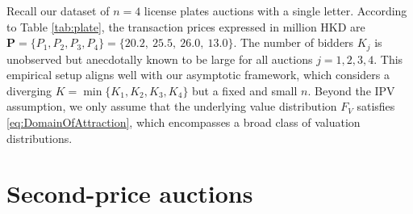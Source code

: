 \begin{runningexamplecont}
Recall our dataset of $n=4$ license plates auctions with a single letter. According to Table \ref{tab:plate}, the transaction prices expressed in million HKD are $\mathbf{P} = \{P_1,P_2,P_3,P_4\} = \{20.2,~ 25.5,~ 26.0,~ 13.0\}$. The number of bidders $K_j$ is unobserved but anecdotally known to be large for all auctions $j=1,2,3,4$. This empirical setup aligns well with our asymptotic framework, which considers a diverging $K = \min\{K_1,K_2,K_3,K_4\}$ but a fixed and small $n$. Beyond the IPV assumption, we only assume that the underlying value distribution $F_V$ satisfies \eqref{eq:DomainOfAttraction}, which encompasses a broad class of valuation distributions.
\end{runningexamplecont}

\section{Second-price auctions}\label{sec:sp}

